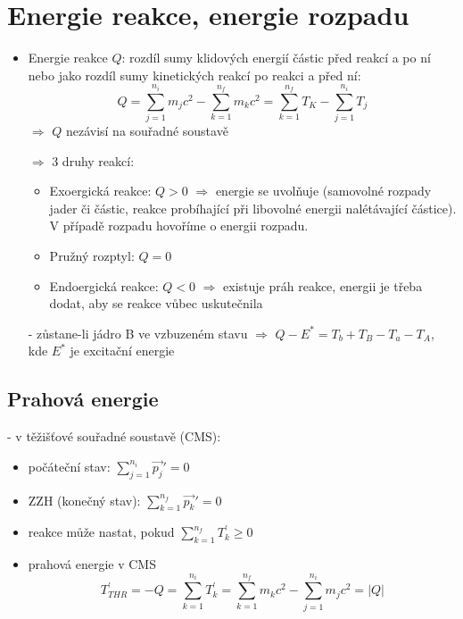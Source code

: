 \documentclass[../../main.tex]{subfiles}
\begin{document}
\section{Energie reakce, energie rozpadu}
\begin{itemize}
	\item Energie reakce $Q$: rozdíl sumy klidových energií částic před reakcí a po ní nebo jako rozdíl sumy kinetických reakcí po reakci a před ní:
	\begin{equation}
	Q = \sum_{j=1}^{n_i}m_j c^2 - \sum_{k=1}^{n_f} m_k c^2 = \sum_{k=1}^{n_f} T_K - \sum_{j=1}^{n_i} T_j
	\end{equation}
	$\Rightarrow$ $Q$ nezávisí na souřadné soustavě
	
	$\Rightarrow$ 3 druhy reakcí: 
	\begin{itemize}
		\item Exoergická reakce: $Q>0$ $\Rightarrow$ energie se uvolňuje (samovolné rozpady jader či částic, reakce probíhající při libovolné energii nalétávající částice). V případě rozpadu hovoříme o energii rozpadu.
		\item Pružný rozptyl: $Q=0$
		\item Endoergická reakce: $Q<0$ $\Rightarrow$ existuje práh reakce, energii je třeba dodat, aby se reakce vůbec uskutečnila
	\end{itemize}
	
- zůstane-li jádro B ve vzbuzeném stavu $\Rightarrow$ $Q - E^* = T_b + T_B - T_a - T_A$, kde $E^*$ je excitační energie	
\end{itemize}

\subsection{Prahová energie}

- v těžišťové souřadné soustavě (CMS):
\begin{itemize}
	\item počáteční stav: $\sum_{j=1}^{n_i} \vec{p_j}' = 0$
	\item ZZH (konečný stav): $\sum_{k=1}^{n_f} \vec{p_k}' = 0$
	\item reakce může nastat, pokud $\sum_{k=1}^{n_f} T_k ^{'} \geq 0$
	\item prahová energie v CMS 
	\begin{equation}
	T_{THR}^{'} = - Q = \sum_{k=1}^{n_i}T_{k}^{'} = \sum_{k=1}^{n_f} m_k c^2 - \sum_{j=1}^{n_i} m_j c^2 = |Q|
	\end{equation}
\end{itemize}
\end{document}
